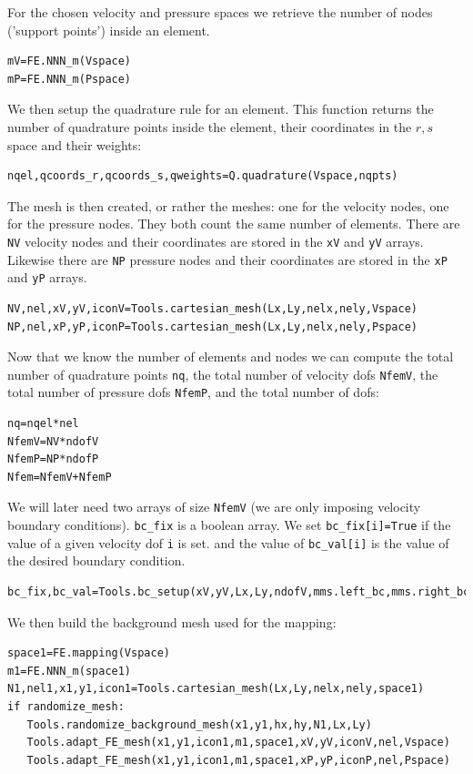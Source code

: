 For the chosen velocity and pressure spaces we retrieve the number of nodes 
('support points') inside an element.
\begin{lstlisting}
mV=FE.NNN_m(Vspace)
mP=FE.NNN_m(Pspace)
\end{lstlisting}

We then setup the quadrature rule for an element. This function 
returns the number of quadrature points inside the element, 
their coordinates in the $r,s$ space and their weights: 
\begin{lstlisting}
nqel,qcoords_r,qcoords_s,qweights=Q.quadrature(Vspace,nqpts)
\end{lstlisting}

The mesh is then created, or rather the meshes: one for the 
velocity nodes, one for the pressure nodes. They both count the 
same number of elements. There are \lstinline{NV} velocity nodes and their
coordinates are stored in the \lstinline{xV} and \lstinline{yV} arrays.
Likewise there are \lstinline{NP} pressure nodes and their
coordinates are stored in the \lstinline{xP} and \lstinline{yP} arrays. 

\begin{lstlisting}
NV,nel,xV,yV,iconV=Tools.cartesian_mesh(Lx,Ly,nelx,nely,Vspace)
NP,nel,xP,yP,iconP=Tools.cartesian_mesh(Lx,Ly,nelx,nely,Pspace)
\end{lstlisting}

Now that we know the number of elements and nodes we can compute the 
total number of quadrature points \lstinline{nq}, 
the total number of velocity dofs \lstinline{NfemV}, 
the total number of pressure dofs \lstinline{NfemP}, 
and the total number of dofs:

\begin{lstlisting}
nq=nqel*nel
NfemV=NV*ndofV
NfemP=NP*ndofP
Nfem=NfemV+NfemP
\end{lstlisting}

We will later need two arrays of size \lstinline{NfemV} (we are only imposing
velocity boundary conditions). \lstinline{bc_fix} is a boolean array.
We set \lstinline{bc_fix[i]=True} if the value of a given velocity dof \lstinline{i} is set. 
and the value of \lstinline{bc_val[i]} is the value of the desired boundary condition.

\begin{lstlisting}
bc_fix,bc_val=Tools.bc_setup(xV,yV,Lx,Ly,ndofV,mms.left_bc,mms.right_bc,mms.bottom_bc,mms.top_bc)
\end{lstlisting}

We then build the background mesh used for the mapping:
\begin{lstlisting}
space1=FE.mapping(Vspace)
m1=FE.NNN_m(space1)
N1,nel1,x1,y1,icon1=Tools.cartesian_mesh(Lx,Ly,nelx,nely,space1)
if randomize_mesh:
   Tools.randomize_background_mesh(x1,y1,hx,hy,N1,Lx,Ly)
   Tools.adapt_FE_mesh(x1,y1,icon1,m1,space1,xV,yV,iconV,nel,Vspace)
   Tools.adapt_FE_mesh(x1,y1,icon1,m1,space1,xP,yP,iconP,nel,Pspace)
\end{lstlisting}




